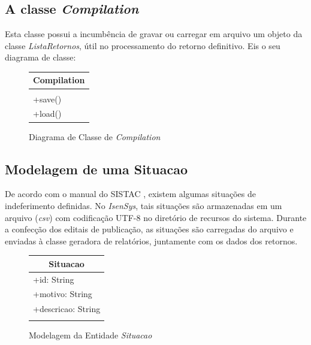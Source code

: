 \documentclass[
	12pt,			%
	openright,		%
	oneside,	
	a4paper,		%
	english,		%
	brazil			%
]{abntex2/abntex2}  %
\begin{document}
			\subsection{A classe \textit{Compilation}} \label{compilation}
	
				Esta classe possui a incumbência de gravar ou carregar em arquivo um objeto da classe \textit{ListaRetornos}, útil no processamento do retorno definitivo. Eis o seu diagrama de classe:
	
				\begin{figure}[h]
					\begin{center}
						
						\caption{Diagrama de Classe de \textit{Compilation}}
						\label{compilation-uml}
						
						\begin{tabular}{|l|}
						\hline
						\multicolumn{1}{|c|}{\textbf{Compilation}} \\ \hline
						\\ \hline
						+save()                                    \\
						+load()                                    \\ \hline
						\end{tabular}
						
					\end{center}
				\end{figure}
	
			\subsection{Modelagem de uma Situacao}
	
				De acordo com o manual do SISTAC \cite{sistac-formatos}, existem algumas situações de indeferimento definidas. No \textit{IsenSys}, tais situações são armazenadas em um arquivo (\textit{csv}) com codificação UTF-8 no diretório de recursos do sistema. Durante a confecção dos editais de publicação, as situações são carregadas do arquivo e enviadas à classe geradora de relatórios, juntamente com os dados dos retornos.
	
				\begin{figure}[h]
					\begin{center}
						
						\caption{Modelagem da Entidade \textit{Situacao}}
						\label{situacao-uml}
						
						\begin{tabular}{|l|}
							\hline
							\multicolumn{1}{|c|}{\textbf{Situacao}} \\ \hline
							+id: String                             \\
							+motivo: String                         \\
							+descricao: String                      \\ \hline
							                                        \\ \hline
						\end{tabular}
						
					\end{center}
				\end{figure}
	
\end{document}
